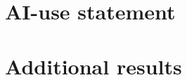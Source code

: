 \documentclass[11pt,a4paper]{article}
\newif\ifshowguide
\theoremstyle{plain}
\theoremstyle{definition}
\theoremstyle{remark}
\newcommand{\guide}[1]{\ifshowguide\par\smallskip\noindent
  \colorbox{gray!12}{\parbox{\dimexpr\linewidth-2\fboxsep}{\small\itshape
  \textbf{Guidance.} #1}}\par\smallskip\fi}
\begin{document}
\section{AI-use statement}

\guide{Required. Which AI tools you used and for what: code, language
editing, finding literature. Every member must be able to explain every
equation and every line of the core code. If you used none, say so.}

\section{Additional results}

\guide{Optional. Proofs, extra figures and tables that support the main
text. Reviewers are not required to read the appendices, so everything
needed to follow the report belongs in the main body.}
\fi

 
\end{document}
